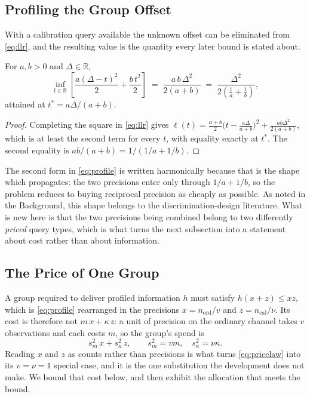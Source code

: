 \subsection{Profiling the Group Offset}
\label{sec:profile}

With a calibration query available the unknown offset can be eliminated from
\eqref{eq:llr}, and the resulting value is the quantity every later bound is stated about.

\begin{theorem}
\label{thm:profile}
For $a,b>0$ and $\Delta\in\mathbb{R}$,
\begin{equation}
\inf_{t\in\mathbb{R}}\left[\frac{a(\Delta-t)^{2}}{2}+\frac{b\,t^{2}}{2}\right]
\;=\;\frac{a\,b\,\Delta^{2}}{2(a+b)}
\;=\;\frac{\Delta^{2}}{2\left(\frac{1}{a}+\frac{1}{b}\right)} ,
\label{eq:profile}
\end{equation}
attained at $t^{*}=a\Delta/(a+b)$.
\end{theorem}

\begin{proof}
Completing the square in \eqref{eq:llr} gives
$\ell(t)=\tfrac{a+b}{2}\bigl(t-\tfrac{a\Delta}{a+b}\bigr)^{2}+\tfrac{ab\Delta^{2}}{2(a+b)}$,
which is at least the second term for every $t$, with equality exactly at $t^{*}$. The
second equality is $ab/(a+b)=1/(1/a+1/b)$.
\end{proof}


The second form in \eqref{eq:profile} is written harmonically because that is the shape
which propagates: the two precisions enter only through $1/a+1/b$, so the problem reduces to
buying reciprocal precision as cheaply as possible. As noted in the Background, this shape
belongs to the discrimination-design literature. What is new here is that the two precisions
being combined belong to two differently \emph{priced} query types, which is what turns the
next subsection into a statement about cost rather than about information.

\subsection{The Price of One Group}
\label{sec:groupcost}

A group required to deliver profiled information $h$ must satisfy $h(x+z)\le xz$, which is
\eqref{eq:profile} rearranged in the precisions $x=n_{\mathrm{ord}}/v$ and
$z=n_{\mathrm{cal}}/\nu$. Its cost is therefore not $m\,x+\kappa\,z$: a unit of precision on
the ordinary channel takes $v$ observations and each costs $m$, so the group's spend is
\begin{equation}
s_{m}^{2}\,x + s_{\kappa}^{2}\,z, \qquad s_{m}^{2}=vm,\quad s_{\kappa}^{2}=\nu\kappa .
\label{eq:groupcost}
\end{equation}
Reading $x$ and $z$ as counts rather than precisions is what turns \eqref{eq:pricelaw} into
its $v=\nu=1$ special case, and it is the one substitution the development does not make. We
bound that cost below, and then exhibit the allocation that meets the bound.

